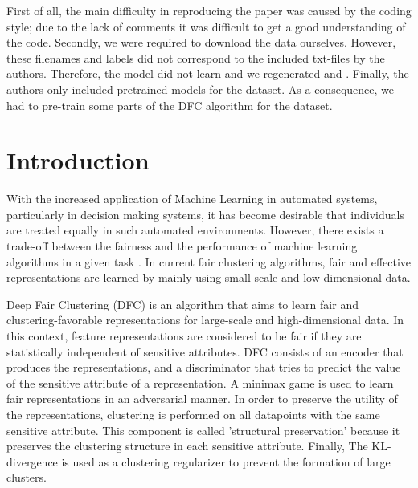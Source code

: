 First of all, the main difficulty in reproducing the paper was caused by the coding style; due to the lack of comments it was difficult to get a good understanding of the code. Secondly, we were required to download the data ourselves. However, these filenames and labels did not correspond to the included txt-files by the authors. Therefore, the model did not learn and we regenerated  and . Finally, the authors only included pretrained models for the \USPSMNIST dataset. As a consequence, we had to pre-train some parts of the DFC algorithm for the \revMNIST dataset.




\newpage

\section{Introduction}

With the increased application of Machine Learning in automated systems, particularly in decision making systems, it has become desirable that individuals are treated equally in such automated environments. However, there exists a trade-off between the fairness and the performance of machine learning algorithms in a given task \citep{Li_2020_CVPR}. In current fair clustering algorithms, fair and effective representations are learned by mainly using small-scale and low-dimensional data. 

Deep Fair Clustering (DFC) is an algorithm that aims to learn fair and clustering-favorable representations for large-scale and high-dimensional data. In this context, feature representations are considered to be fair if they are statistically independent of sensitive attributes. DFC consists of an encoder that produces the representations, and a discriminator that tries to predict the value of the sensitive attribute of a representation. A minimax game is used to learn fair representations in an adversarial manner. In order to preserve the utility of the representations, clustering is performed on all datapoints with the same sensitive attribute. This component is called 'structural preservation' because it preserves the clustering structure in each sensitive attribute. Finally, The KL-divergence is used as a clustering regularizer to prevent the formation of large clusters.


